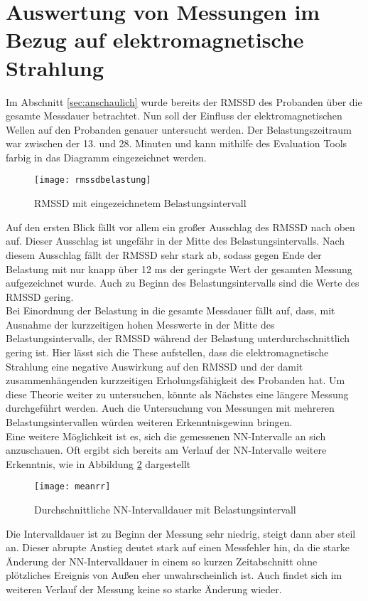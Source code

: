 \section{Auswertung von Messungen im Bezug auf elektromagnetische Strahlung}
Im Abschnitt \ref{sec:anschaulich} wurde bereits der RMSSD des Probanden über die gesamte Messdauer betrachtet. Nun soll der Einfluss der elektromagnetischen Wellen auf den Probanden genauer untersucht werden. Der Belastungszeitraum war zwischen der 13. und 28. Minuten und kann mithilfe des Evaluation Tools farbig in das Diagramm eingezeichnet werden.
\begin{figure}[H]
	\centering
	\texttt{[image: rmssdbelastung]}
	\caption{RMSSD mit eingezeichnetem Belastungsintervall}
	\label{fig:rmssdbelastung}
\end{figure}
Auf den ersten Blick fällt vor allem ein großer Ausschlag des RMSSD nach oben auf. Dieser Ausschlag ist ungefähr in der Mitte des Belastungsintervalls. Nach diesem Ausschlag fällt der RMSSD sehr stark ab, sodass gegen Ende der Belastung mit nur knapp über 12 ms der geringste Wert der gesamten Messung aufgezeichnet wurde. Auch zu Beginn des Belastungsintervalls sind die Werte des RMSSD gering. \\
Bei Einordnung der Belastung in die gesamte Messdauer fällt auf, dass, mit Ausnahme der kurzzeitigen hohen Messwerte in der Mitte des Belastungsintervalls, der RMSSD während der Belastung unterdurchschnittlich gering ist. Hier lässt sich die These aufstellen, dass die elektromagnetische Strahlung eine negative Auswirkung auf den RMSSD und der damit zusammenhängenden kurzzeitigen Erholungsfähigkeit des Probanden hat. Um diese Theorie weiter zu untersuchen, könnte als Nächstes eine längere Messung durchgeführt werden. Auch die Untersuchung von Messungen mit mehreren Belastungsintervallen würden weiteren Erkenntnisgewinn bringen. \\
Eine weitere Möglichkeit ist es, sich die gemessenen NN-Intervalle an sich anzuschauen. Oft ergibt sich bereits am Verlauf der NN-Intervalle weitere Erkenntnis, wie in Abbildung \ref{fig:meanrr} dargestellt
\begin{figure}[H]
	\centering
	\texttt{[image: meanrr]}
	\caption{Durchschnittliche NN-Intervalldauer mit Belastungsintervall }
	\label{fig:meanrr}
\end{figure}

Die Intervalldauer ist zu Beginn der Messung sehr niedrig, steigt dann aber steil an. Dieser abrupte Anstieg deutet stark auf einen Messfehler hin, da die starke Änderung der NN-Intervalldauer in einem so kurzen Zeitabschnitt ohne plötzliches Ereignis von Außen eher unwahrscheinlich ist. Auch findet sich im weiteren Verlauf der Messung keine so starke Änderung wieder.\\

